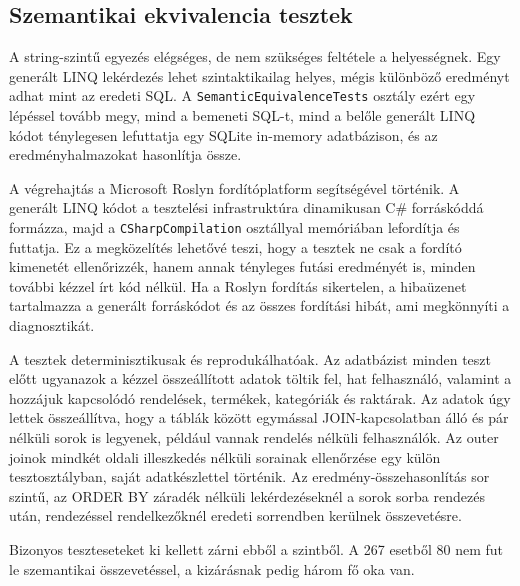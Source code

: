 \documentclass[a4paper,12pt]{article}
\begin{document}
\subsection{Szemantikai ekvivalencia tesztek}

A string-szintű egyezés elégséges, de nem szükséges feltétele a helyességnek. Egy generált LINQ lekérdezés lehet szintaktikailag helyes, mégis különböző eredményt adhat mint az eredeti SQL. A \texttt{SemanticEquivalenceTests} osztály ezért egy lépéssel tovább megy, mind a bemeneti SQL-t, mind a belőle generált LINQ kódot ténylegesen lefuttatja egy SQLite in-memory adatbázison, és az eredményhalmazokat hasonlítja össze.

A végrehajtás a Microsoft Roslyn fordítóplatform segítségével történik. A generált LINQ kódot a tesztelési infrastruktúra dinamikusan C\# forráskóddá formázza, majd a \texttt{CSharpCompilation} osztállyal memóriában lefordítja és futtatja. Ez a megközelítés lehetővé teszi, hogy a tesztek ne csak a fordító kimenetét ellenőrizzék, hanem annak tényleges futási eredményét is, minden további kézzel írt kód nélkül. Ha a Roslyn fordítás sikertelen, a hibaüzenet tartalmazza a generált forráskódot és az összes fordítási hibát, ami megkönnyíti a diagnosztikát.

A tesztek determinisztikusak és reprodukálhatóak. Az adatbázist minden teszt előtt ugyanazok a kézzel összeállított adatok töltik fel, hat felhasználó, valamint a hozzájuk kapcsolódó rendelések, termékek, kategóriák és raktárak. Az adatok úgy lettek összeállítva, hogy a táblák között egymással JOIN-kapcsolatban álló és pár nélküli sorok is legyenek, például vannak rendelés nélküli felhasználók. Az outer joinok mindkét oldali illeszkedés nélküli sorainak ellenőrzése egy külön tesztosztályban, saját adatkészlettel történik. Az eredmény-összehasonlítás sor szintű, az ORDER BY záradék nélküli lekérdezéseknél a sorok sorba rendezés után, rendezéssel rendelkezőknél eredeti sorrendben kerülnek összevetésre.

Bizonyos teszteseteket ki kellett zárni ebből a szintből. A 267 esetből 80 nem fut le szemantikai összevetéssel, a kizárásnak pedig három fő oka van.
\end{document}
